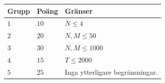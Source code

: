 \noindent
\begin{tabular}{| l | l | p{12cm} |}
  \hline
  \textbf{Grupp} & \textbf{Poäng} & \textbf{Gränser} \\ \hline
  $1$    & $10$      & $N \le 4$ \\ \hline
  $2$    & $20$      & $N, M \le 50$ \\ \hline
  $3$    & $30$      & $N, M \le 1000$ \\ \hline
  $4$    & $15$      & $T \le 2000$ \\ \hline
  $5$    & $25$      & Inga ytterligare begränsningar. \\ \hline
\end{tabular}
